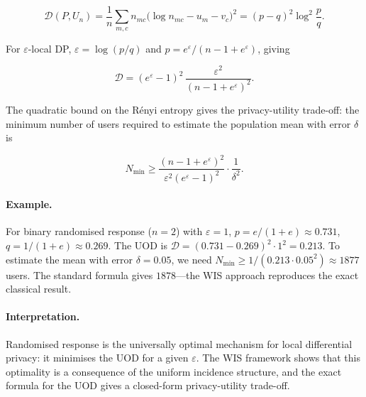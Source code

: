 \[
\mathcal D(P,U_n)
= \frac{1}{n}\sum_{m,c} n_{mc}\bigl(\log n_{mc} - u_m - v_c\bigr)^2
= (p-q)^2\log^2\frac{p}{q}.
\]

For $\varepsilon$-local DP, $\varepsilon=\log(p/q)$ and
$p=e^\varepsilon/(n-1+e^\varepsilon)$, giving

\[
\mathcal D = (e^\varepsilon-1)^2\,\frac{\varepsilon^2}{(n-1+e^\varepsilon)^2}.
\]

The quadratic bound on the R\'enyi entropy gives the privacy-utility
trade-off: the minimum number of users required to estimate the
population mean with error $\delta$ is

\[
N_{\min} \ge \frac{(n-1+e^\varepsilon)^2}{\varepsilon^2(e^\varepsilon-1)^2}
\cdot\frac{1}{\delta^2}.
\]

\paragraph{Example.}
For binary randomised response ($n=2$) with $\varepsilon=1$,
$p=e/(1+e)\approx0.731$, $q=1/(1+e)\approx0.269$.
The UOD is $\mathcal D = (0.731-0.269)^2\cdot1^2 = 0.213$.
To estimate the mean with error $\delta=0.05$, we need
$N_{\min}\ge 1/(0.213\cdot0.05^2)\approx1877$ users.
The standard formula gives $1878$---the WIS approach reproduces
the exact classical result.

\paragraph{Interpretation.}
Randomised response is the universally optimal mechanism for
local differential privacy: it minimises the UOD for a given
$\varepsilon$.  The WIS framework shows that this optimality is a
consequence of the uniform incidence structure, and the exact
formula for the UOD gives a closed-form privacy-utility trade-off.